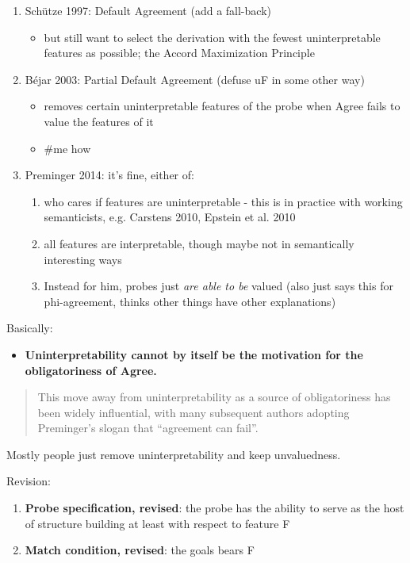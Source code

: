 \begin{enumerate}
  \item Schütze 1997: Default Agreement (add a fall-back)
  \begin{itemize}
    \item but still want to select the derivation with the fewest uninterpretable features as possible; the Accord Maximization Principle
  \end{itemize}
  \item Béjar 2003: Partial Default Agreement (defuse uF in some other way)
  \begin{itemize}
    \item removes certain uninterpretable features of the probe when Agree fails to value the features of it
    \item \#me how
  \end{itemize}
  \item Preminger 2014: it's fine, either of:
  \begin{enumerate}
    \item who cares if features are uninterpretable - this is in practice with working semanticists, e.g. Carstens 2010, Epstein et al. 2010
    \item all features are interpretable, though maybe not in semantically interesting ways
    \item Instead for him, probes just \textit{are able to be} valued (also just says this for phi-agreement, thinks other things have other explanations)
  \end{enumerate}
\end{enumerate}

Basically:

\begin{itemize}
  \item \textbf{Uninterpretability cannot by itself be the motivation for the obligatoriness of Agree.}
\end{itemize}

\begin{quote}
This move away from uninterpretability as a source of obligatoriness has been widely influential, with many subsequent authors adopting Preminger's slogan that ``agreement can fail''.

\end{quote}

Mostly people just remove uninterpretability and keep unvaluedness.

Revision:

\begin{enumerate}
  \item \textbf{Probe specification, revised}: the probe has the ability to serve as the host of structure building at least with respect to feature F
  \item \textbf{Match condition, revised}: the goals bears F
\end{enumerate}

